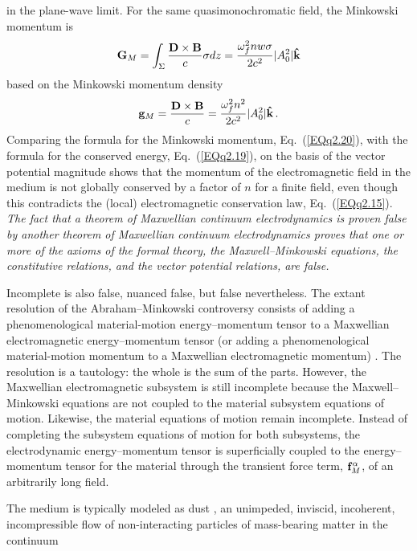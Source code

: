 \documentclass[twocolumn,amssymb,eqsecnum,aps,pra]{revtex4-2}
\begin{document}
in the plane-wave limit.
For the same quasimonochromatic field, the Minkowski momentum is
\begin{equation}
{\bf G}_M=\int_{\Sigma} \frac{{\bf D}\times{\bf B}}{c}
\sigma dz 
=\frac{\omega_f^2 n w \sigma}{2c^2}|A_0^2|{\bf \hat k}
\label{EQq2.20}
\end{equation}
based on the Minkowski momentum density
\begin{equation}
{\bf g}_M=\frac{{\bf D}\times{\bf B} }{c}
=\frac{\omega_f^2 n^2}{2c^2}|A_0^2|{\bf \hat k} \, .
\label{EQq2.21}
\end{equation}
Comparing the formula for the Minkowski momentum,
Eq.~(\ref{EQq2.20}), with the formula for the conserved energy,
Eq.~(\ref{EQq2.19}), on the basis of the vector potential magnitude 
shows that the momentum of the electromagnetic field in the medium is
not globally conserved by a factor of $n$ for a finite field, even
though this contradicts the (local) electromagnetic conservation law,
Eq.~(\ref{EQq2.15}).
\textit{The fact that a theorem of Maxwellian
continuum electrodynamics is proven false by another theorem of
Maxwellian continuum electrodynamics proves that one or more of
the axioms of the formal theory, the Maxwell--Minkowski equations,
the constitutive relations, and the vector potential relations,
are false.}
\par
Incomplete is also false, nuanced false, but false nevertheless.
The extant resolution of the Abraham--Minkowski controversy consists
of adding a phenomenological material-motion energy--momentum tensor
to a Maxwellian electromagnetic energy--momentum tensor (or adding
a phenomenological material-motion momentum to a Maxwellian
electromagnetic momentum)
\cite{BIRL,BIBoydMil,BIPfei,BIAMC4,BIKemplatest,BIPenHaus,BIGord,BIBarn,BIBarnLou,BIKranys,BIObukPLA,BIBrevCons}.
The resolution is a tautology: the whole is the sum of the parts.
However, the Maxwellian electromagnetic subsystem is still incomplete
because the Maxwell--Minkowski equations are not coupled to the
material subsystem equations of motion.
Likewise, the material equations of motion remain incomplete.
Instead of completing the subsystem equations of motion for both
subsystems, the electrodynamic energy--momentum tensor is
superficially coupled to the energy--momentum tensor for the
material through the transient force term, ${\bf f}^{\alpha}_M$,
of an arbitrarily long field.
\par
The medium is typically modeled as dust \cite{BIPfei}, an 
unimpeded, inviscid, incoherent, incompressible flow of
non-interacting particles of mass-bearing matter in the continuum
\end{document}
